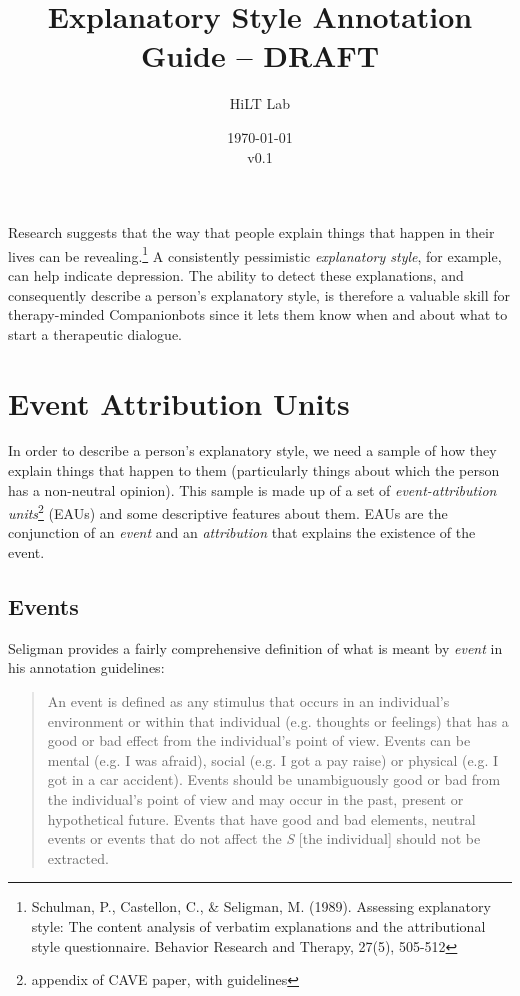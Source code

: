 \documentclass[a4paper,12pt]{article}
\begin{document}
\title{Explanatory Style Annotation Guide -- DRAFT}
\author{HiLT Lab}
\date{\today\\v0.1}
\maketitle

\tableofcontents
\break

Research suggests that the way that people explain things that happen in their lives can be revealing.\footnote{\label{seligman89}Schulman, P., Castellon, C., \& Seligman, M. (1989). Assessing explanatory style: The content analysis of verbatim explanations and the attributional style questionnaire. Behavior Research and Therapy, 27(5), 505-512} %
A consistently pessimistic \emph{explanatory style}, for example, can help indicate depression.
The ability to detect these explanations, and consequently describe a person's explanatory style, is therefore a valuable skill for therapy-minded Companionbots since it lets them know when and about what to start a therapeutic dialogue.

\section{Event Attribution Units}
In order to describe a person's explanatory style, we need a sample of how they explain things that happen to them (particularly things about which the person has a non-neutral opinion). %
This sample is made up of a set of \emph{event-attribution units}\footnote{\label{CAVE}appendix of CAVE paper, with guidelines} (EAUs) and some descriptive features about them. %
EAUs are the conjunction of an \emph{event} and an \emph{attribution} that explains the existence of the event.
 

\subsection{Events}

Seligman provides a fairly comprehensive definition of what is meant by \emph{event} in his annotation guidelines: %

\begin{quote}
    An event is defined as any stimulus that occurs in an individual's environment or within that individual (e.g. thoughts or feelings) that has a good or bad effect from the individual's point of view.
    Events can be mental (e.g. I was afraid), social (e.g. I got a pay raise) or physical (e.g. I got in a car accident).
    Events should be unambiguously good or bad from the individual's point of view and may occur in the past, present or hypothetical future.
    Events that have good and bad elements, neutral events or events that do not affect the \emph{S} [the individual] should not be extracted.
\end{quote}
\end{document}
